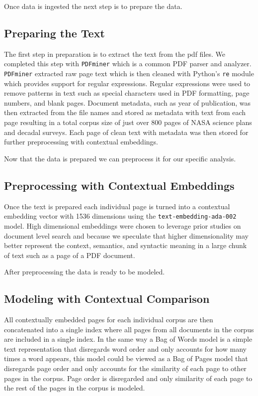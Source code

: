 \documentclass[preprint,12pt]{elsarticle}
\begin{document}
Once data is ingested the next step is to prepare the data.

\subsection{Preparing the Text}
The first step in preparation is to extract the text from the pdf files. We completed this step with \texttt{PDFminer} which is a common PDF parser and analyzer\cite{pdfminer}. \texttt{PDFminer} extracted raw page text which is then cleaned with Python's \texttt{re} module which provides support for regular expressions. Regular expressions were used to remove patterns in text such as special characters used in PDF formatting, page numbers, and blank pages. Document metadata, such as year of publication, was then extracted from the file names and stored as metadata with text from each page resulting in a total corpus size of just over 800 pages of NASA science plans and decadal surveys. Each page of clean text with metadata was then stored for further preprocessing with contextual embeddings. 

Now that the data is prepared we can preprocess it for our specific analysis.

\subsection{Preprocessing with Contextual Embeddings}

Once the text is prepared each individual page is turned into a contextual embedding vector with 1536 dimensions using the \texttt{text-embedding-ada-002} model. High dimensional embeddings were chosen to leverage prior studies on document level search \cite{Aperdannier2024_embedding_search} and because we speculate that higher dimensionality may better represent the context, semantics, and syntactic meaning in a large chunk of text such as a page of a PDF document. 

After preprocessing the data is ready to be modeled. 

\subsection{Modeling with Contextual Comparison}
All contextually embedded pages for each individual corpus are then concatenated into a single index where all pages from all documents in the corpus are included in a single index. In the same way a Bag of Words model is a simple text representation that disregards word order and only accounts for how many times a word appears, this model could be viewed as a Bag of Pages model that disregards page order and only accounts for the similarity of each page to other pages in the corpus. Page order is disregarded and only similarity of each page to the rest of the pages in the corpus is modeled. 
\end{document}
